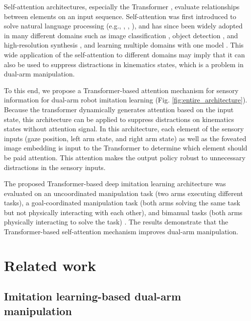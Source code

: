 \documentclass[letterpaper, 10 pt, conference]{ieeeconf}  %
\renewcommand\hl[1]{#1} %
\begin{document}
Self-attention architectures, especially the Transformer \cite{vaswani2017attention}, evaluate relationships between elements on an input sequence. 
Self-attention was first introduced to solve natural language processing (e.g., \cite{devlin2018bert}, \cite{brown2020language}, \cite{dosovitskiy2020image}), and has since been widely adopted in many different domains such as image classification \cite{dosovitskiy2020image}, object detection \cite{carion2020end}, and high-resolution synthesis \cite{esser2020taming}, and learning multiple domains with one model \cite{kaiser2017one}. This wide application of the self-attention to different domains may imply that it can also be used to suppress distractions in kinematics states, which is a problem in dual-arm manipulation.

To this end, we propose a Transformer-based attention mechanism for sensory information for dual-arm robot imitation learning (Fig. \ref{fig:entire_architecture}). 
\hl{Because the transformer dynamically generates attention based on the input state, this architecture can be applied to suppress distractions on kinematics states without attention signal.}
In this architecture, each element of the sensory inputs (gaze position, left arm state, and right arm state) as well as the foveated image embedding is input to the Transformer to determine which element should be paid attention. This attention makes the output policy robust to unnecessary distractions in the sensory inputs.

The proposed Transformer-based deep imitation learning architecture was evaluated on an uncoordinated manipulation task (two arms executing different tasks), a goal-coordinated manipulation task (both arms solving the same task but not physically interacting with each other), %
and bimanual tasks (both arms physically interacting to solve the task) \cite{smith2012dual}. The results demonstrate that the Transformer-based self-attention mechanism improves dual-arm manipulation.


\section{Related work}
\subsection{Imitation learning-based dual-arm manipulation}
\end{document}
